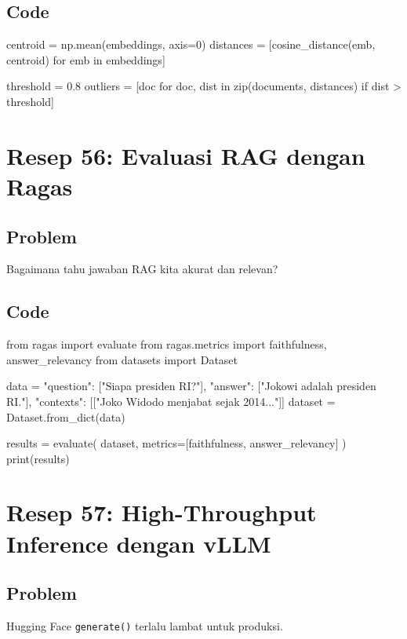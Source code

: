 \subsection*{Code}
\begin{codeblock}[language=Python]
centroid = np.mean(embeddings, axis=0)
distances = [cosine_distance(emb, centroid) for emb in embeddings]

threshold = 0.8
outliers = [doc for doc, dist in zip(documents, distances) if dist > threshold]
\end{codeblock}


\newpage

\section{Resep 56: Evaluasi RAG dengan Ragas}

\subsection*{Problem}
Bagaimana tahu jawaban RAG kita akurat dan relevan?

\subsection*{Code}
\begin{codeblock}[language=Python]
from ragas import evaluate
from ragas.metrics import faithfulness, answer_relevancy
from datasets import Dataset

data = {
    "question": ["Siapa presiden RI?"],
    "answer": ["Jokowi adalah presiden RI."],
    "contexts": [["Joko Widodo menjabat sejak 2014..."]]
}
dataset = Dataset.from_dict(data)

results = evaluate(
    dataset,
    metrics=[faithfulness, answer_relevancy]
)
print(results)
\end{codeblock}

\newpage

\section{Resep 57: High-Throughput Inference dengan vLLM}

\subsection*{Problem}
Hugging Face \texttt{generate()} terlalu lambat untuk produksi.

